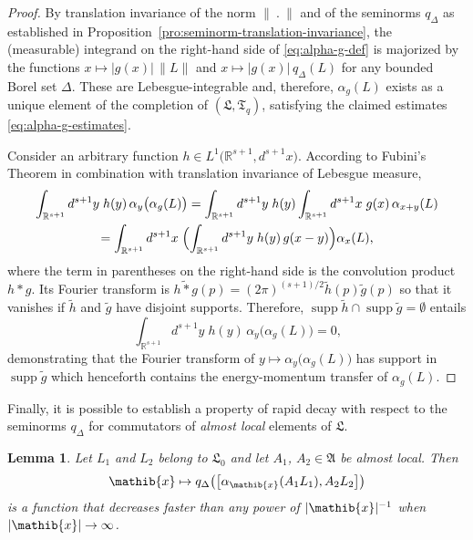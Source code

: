 \documentclass[a4paper,a4paper]{article}
\numberwithin{equation}{section}
\newcommand{\Afrak}{\mathfrak{A}}
\newcommand{\Lfrak}{\mathfrak{L}}
\newcommand{\Tfrak}{\mathfrak{T}}
\newcommand{\xib}{\mathib{x}}
\newcommand{\Rsone}{\mathbb{R}^{s + 1}}
\newcommand{\aibx}{\alpha_\mathib{x}}
\newcommand{\ax}{\alpha_x}
\theoremstyle{definition}
\theoremstyle{plain}
\newtheorem{lemma}[definition]{Lemma}
\theoremstyle{remark}
\DeclareMathOperator{\supp}{supp}
\newcommand{\bcomm}[2]{\bigl[ #1 , #2 \bigr]}
\newcommand{\abs}[1]{\lvert #1 \rvert}
\newcommand{\norm}[1]{\lVert #1 \rVert}
\newcommand{\qD}{q_\Delta}
\newcommand{\qDx}[1]{q_\Delta ( #1 )}
\newcommand{\bqDx}[1]{q_\Delta \bigl( #1 \bigr)}
\begin{document}
  \begin{proof}
    By translation invariance of the norm $\norm{~.~}$ and of the
    seminorms $\qD$ as established in
    Proposition~\ref{pro:seminorm-translation-invariance}, the
    (measurable) integrand on the right-hand side of
    \eqref{eq:alpha-g-def} is majorized by the functions $x \mapsto
    \abs{g ( x )} \, \norm{L}$ and $x \mapsto \abs{g ( x )} \,
    \qDx{L}$ for any bounded Borel set $\Delta$.  These are
    Lebesgue-integrable and, therefore, $\alpha_g ( L )$ exists as a
    unique element of the completion of $( \Lfrak , \Tfrak_q )$,
    satisfying the claimed estimates \eqref{eq:alpha-g-estimates}.

    Consider an arbitrary function $h \in L^1 \bigl( \Rsone , d^{s +
    1} x \bigr)$. According to Fubini's Theorem
    \cite[II.16.3]{fell/doran:1988a} in combination with translation
    invariance of Lebesgue measure,
    \begin{multline*}
      \int_{\Rsone} d^{s + 1} y \; h ( y ) \, \alpha_y \bigl( \alpha_g
      ( L ) \bigr) = \int_{\Rsone} d^{s + 1} y \; h ( y )
      \int_{\Rsone} d^{s + 1} x \; g ( x ) \, \alpha_{x + y} ( L ) \\ 
      = \int_{\Rsone} d^{s + 1} x \; \Bigl( \int_{\Rsone} d^{s + 1} y
      \; h ( y ) \, g ( x - y ) \Bigr) \ax ( L ) \text{,}
    \end{multline*}
    where the term in parentheses on the right-hand side is the
    convolution product $h \ast g$. Its Fourier transform is
    $\widetilde{h \ast g} ( p ) = ( 2 \pi )^{( s + 1 ) / 2} \tilde{h}
    ( p ) \tilde{g} ( p )$
    \cite[Theorem~VI.(21.41)]{hewitt/stromberg:1969} so that it
    vanishes if $\tilde{h}$ and $\tilde{g}$ have disjoint supports.
    Therefore, $\supp \tilde{h} \cap \supp \tilde{g} = \emptyset$
    entails
    \begin{equation*}
      \int_{\Rsone} d^{s + 1} y \; h ( y ) \, \alpha_y \bigl( \alpha_g
      ( L ) \bigr) = 0 \text{,}
    \end{equation*}
    demonstrating that the Fourier transform of $y \mapsto \alpha_y
    \bigl( \alpha_g ( L ) \bigr)$ has support in $\supp \tilde{g}$
    which henceforth contains the energy-momentum transfer of
    $\alpha_g ( L )$.
  \end{proof}
  Finally, it is possible to establish a property of rapid decay with
  respect to the seminorms $\qD$ for commutators of \emph{almost
    local} elements of $\Lfrak$.
  \begin{lemma}
    \label{lem:commutator-qd-decay}
    Let $L_1$ and $L_2$ belong to $\Lfrak_0$ and let $A_1$, $A_2
    \in \Afrak$ be almost local. Then
    \begin{equation*}
      \xib \mapsto \bqDx{\bcomm{\aibx ( A_1 L_1 )}{A_2 L_2}}
    \end{equation*}
    is a function that decreases faster than any power of
    $\abs{\xib}^{-1}$ when $\abs{\xib} \rightarrow \infty$.
  \end{lemma}
\end{document}
